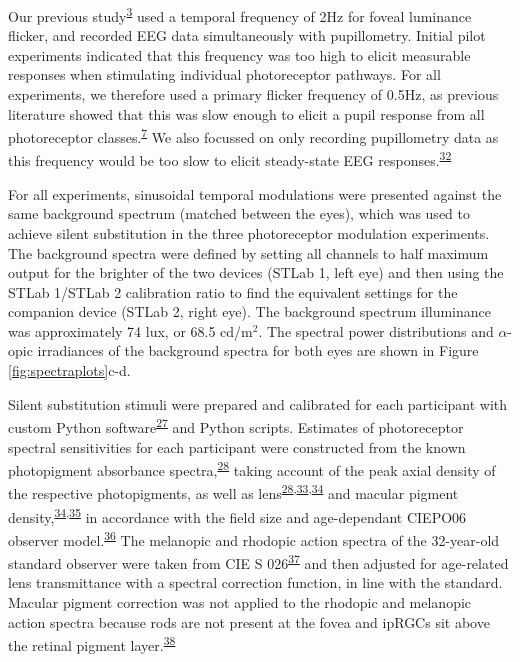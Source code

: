 \documentclass[
]{article}
\begin{document}
Our previous study\textsuperscript{\protect\hyperlink{ref-Segala2023}{3}} used a temporal frequency of 2Hz for foveal luminance flicker, and recorded EEG data simultaneously with pupillometry. Initial pilot experiments indicated that this frequency was too high to elicit measurable responses when stimulating individual photoreceptor pathways. For all experiments, we therefore used a primary flicker frequency of 0.5Hz, as previous literature showed that this was slow enough to elicit a pupil response from all photoreceptor classes.\textsuperscript{\protect\hyperlink{ref-Spitschan2014}{7}} We also focussed on only recording pupillometry data as this frequency would be too slow to elicit steady-state EEG responses.\textsuperscript{\protect\hyperlink{ref-Norcia2015}{32}}

For all experiments, sinusoidal temporal modulations were presented against the same background spectrum (matched between the eyes), which was used to achieve silent substitution in the three photoreceptor modulation experiments. The background spectra were defined by setting all channels to half maximum output for the brighter of the two devices (STLab 1, left eye) and then using the STLab 1/STLab 2 calibration ratio to find the equivalent settings for the companion device (STLab 2, right eye). The background spectrum illuminance was approximately 74 lux, or 68.5 cd/m\(^2\). The spectral power distributions and \(\alpha\)-opic irradiances of the background spectra for both eyes are shown in Figure \ref{fig:spectraplots}c-d.

Silent substitution stimuli were prepared and calibrated for each participant with custom Python software\textsuperscript{\protect\hyperlink{ref-Martin2023}{27}} and Python scripts. Estimates of photoreceptor spectral sensitivities for each participant were constructed from the known photopigment absorbance spectra,\textsuperscript{\protect\hyperlink{ref-Stockman2000}{28}} taking account of the peak axial density of the respective photopigments, as well as lens\textsuperscript{\protect\hyperlink{ref-Stockman2000}{28},\protect\hyperlink{ref-Pokorny1987}{33},\protect\hyperlink{ref-Stockman1999}{34}} and macular pigment density,\textsuperscript{\protect\hyperlink{ref-Stockman1999}{34},\protect\hyperlink{ref-Bone1988}{35}} in accordance with the field size and age-dependant CIEPO06 observer model.\textsuperscript{\protect\hyperlink{ref-CIE2006}{36}} The melanopic and rhodopic action spectra of the 32-year-old standard observer were taken from CIE S 026\textsuperscript{\protect\hyperlink{ref-CIE2018}{37}} and then adjusted for age-related lens transmittance with a spectral correction function, in line with the standard. Macular pigment correction was not applied to the rhodopic and melanopic action spectra because rods are not present at the fovea and ipRGCs sit above the retinal pigment layer.\textsuperscript{\protect\hyperlink{ref-Trieschmann2007}{38}}
\end{document}
